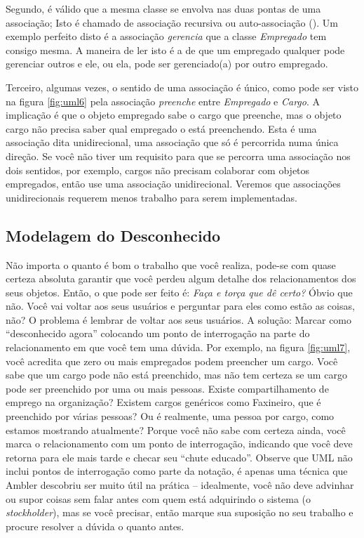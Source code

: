 \documentclass[
	article,			%
	12pt,				%
	openright,
	twoside,			%
	a4paper,			%
	english,			%
	french,
	brazil,				%
	sumario=tradicional
	]{abntex2}
\begin{document}
Segundo, é válido que a mesma classe se envolva nas duas pontas de uma associação; Isto é chamado de associação recursiva ou auto-associação (). Um exemplo perfeito disto é a associação \emph{gerencia} que a classe \emph{Empregado} tem consigo mesma. A maneira de ler isto é a de que um empregado qualquer pode gerenciar outros e ele, ou ela, pode ser gerenciado(a) por outro empregado.

Terceiro, algumas vezes, o sentido de uma associação é único, como pode ser visto na figura \ref{fig:uml6} pela associação \emph{preenche} entre \emph{Empregado} e \emph{Cargo}. A implicação é que o objeto empregado sabe o cargo que preenche, mas o objeto cargo não precisa saber qual empregado o está preenchendo. Esta é uma associação dita unidirecional, uma associação que só é percorrida numa única direção. Se você não tiver um requisito para que se percorra uma associação nos dois sentidos, por exemplo, cargos não precisam colaborar com objetos empregados, então use uma associação unidirecional. Veremos que associações unidirecionais requerem menos trabalho para serem implementadas.

\subsection{Modelagem do Desconhecido}

Não importa o quanto é bom o trabalho que você realiza, pode-se com quase certeza absoluta garantir que você perdeu algum detalhe dos relacionamentos dos seus objetos. Então, o que pode ser feito é: \textit{Faça e torça que dê certo?} Óbvio que não. Você vai voltar aos seus usuários e perguntar para eles como estão as coisas, não? O problema é lembrar de voltar aos seus usuários. A solução: Marcar como ``desconhecido agora'' colocando um ponto de interrogação na parte do relacionamento em que você tem uma dúvida. Por exemplo, na figura \ref{fig:uml7}, você acredita que zero ou mais empregados podem preencher um cargo. Você sabe que um cargo pode não está preenchido, mas não tem certeza se um cargo pode ser preenchido por uma ou mais pessoas. Existe compartilhamento de emprego na organização? Existem cargos genéricos como Faxineiro, que é preenchido por várias pessoas? Ou é realmente, uma pessoa por cargo, como estamos mostrando atualmente? Porque você não sabe com certeza ainda, você marca o relacionamento com um ponto de interrogação, indicando que você deve retorna para ele mais tarde e checar seu ``chute educado''. Observe que UML não inclui pontos de interrogação como parte da notação, é apenas uma técnica que Ambler descobriu ser muito útil na prática -- idealmente, você não deve advinhar ou supor coisas sem falar antes com quem está adquirindo o sistema (o \textit{stockholder}), mas se você precisar, então marque sua suposição no seu trabalho e procure resolver a dúvida o quanto antes.
\end{document}
